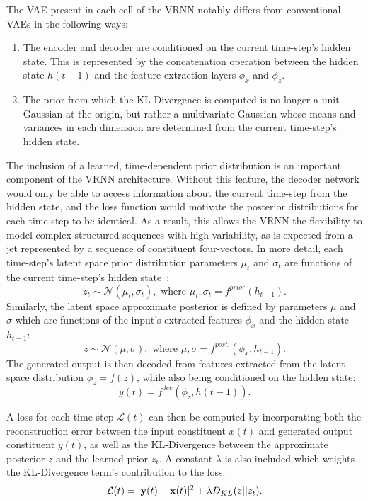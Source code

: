 \documentclass[11pt, a4paper]{article}
\begin{document}
The VAE present in each cell of the VRNN notably differs from
conventional VAEs in the following ways:
\begin{enumerate}
  \item{The encoder and decoder are conditioned on the current time-step's hidden state.
  This is represented by the concatenation operation between the hidden state $h(t-1)$ and the feature-extraction layers $\phi_{x}$ and $\phi_{z}$.}
  \item{The prior from which the KL-Divergence is computed is no longer a unit Gaussian
  at the origin, but rather a multivariate Gaussian whose means and variances in each 
  dimension are determined from the current time-step's hidden state.}
\end{enumerate}

The inclusion of a learned, time-dependent prior distribution is an important component of the VRNN architecture. Without this feature, the decoder network would only be able to access information about the current time-step from the hidden state, and the loss function would motivate the posterior distributions for each time-step to be identical. As a result, this allows the VRNN the flexibility to model complex structured sequences with high variability, as is expected from a jet represented by a sequence of constituent four-vectors.
In more detail, each time-step's latent space prior distribution parameters $\mu_{t}$ and $\sigma_{t}$ are functions of the current time-step's hidden state~\cite{chung2016recurrent}:
\begin{equation}
	z_{t} \sim \mathcal{N}(\mu_{t}, \sigma_{t}), \text{ where } \mu_{t}, \sigma_{t} = f^{prior}(h_{t-1}).
\end{equation} 
Similarly, the latent space approximate posterior is defined by parameters $\mu$ and $\sigma$ which are functions of the input's extracted features $\phi_{x}$ and the hidden state $h_{t-1}$:
\begin{equation}
	z \sim \mathcal{N}(\mu, \sigma), \text{ where } \mu, \sigma = f^{post.}(\phi_{x}, h_{t-1}).
\end{equation} 
The generated output is then decoded from features extracted from the latent space distribution $\phi_{z} = f(z)$, while also being conditioned on the hidden state:
\begin{equation}
y(t) = f^{dec}(\phi_{z}, h(t-1)).
\end{equation} 

A loss for each time-step $\mathcal{L}(t)$ can then be computed by incorporating both the reconstruction error between the input constituent $x(t)$ and generated output constituent $y(t)$, as well as the KL-Divergence between the approximate posterior $z$ and the learned prior $z_{t}$. A constant $\lambda$ is also included which weights the KL-Divergence term's contribution to the loss:
\begin{equation}
\mathcal{L}(t) = |{\bf y}(t) - {\bf x}(t)|^{2} + \lambda D_{KL}(z||z_{t}).
\end{equation} 
\end{document}
